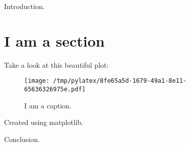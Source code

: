 \documentclass{article}%
\begin{document}
%
\normalsize%
Introduction.%
\section{I am a section}%
\label{sec:I am a section}%
Take a look at this beautiful plot:%


\begin{figure}[htbp]%
\centering%
\texttt{[image: /tmp/pylatex/8fe65a5d-1679-49a1-8e11-65636326975e.pdf]}%
\caption{I am a caption.}%
\end{figure}

%
Created using matplotlib.

%
Conclusion.%
\end{document}

